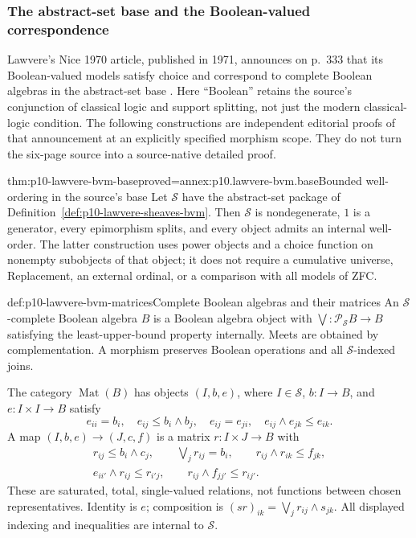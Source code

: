 \subsubsection{The abstract-set base and the Boolean-valued correspondence}

Lawvere's Nice 1970 article, published in 1971, announces on p.~333
that its Boolean-valued models satisfy choice and correspond to complete
Boolean algebras in the abstract-set base \cite[p.~333]{Lawvere1970}.
Here ``Boolean'' retains the source's conjunction of classical logic and
support splitting, not just the modern classical-logic condition.
The following constructions are independent editorial proofs of that
announcement at an explicitly specified morphism scope. They do not turn
the six-page source into a source-native detailed proof.

\begin{hblemma}{thm:p10-lawvere-bvm-base}{proved=annex:p10.lawvere-bvm.base}{Bounded well-ordering in the source's base}
Let \(\mathcal S\) have the abstract-set package of
Definition~\ref{def:p10-lawvere-sheaves-bvm}. Then \(\mathcal S\)
is nondegenerate, \(1\) is a generator, every epimorphism splits,
and every object admits an internal well-order. The latter construction
uses power objects and a choice function on nonempty subobjects of that
object; it does not require a cumulative universe, Replacement, an
external ordinal, or a comparison with all models of ZFC.
\end{hblemma}

\begin{hbdefinition}{def:p10-lawvere-bvm-matrices}{Complete Boolean algebras and their matrices}
An \(\mathcal S\)-complete Boolean algebra \(B\) is a Boolean
algebra object with \(\bigvee:\mathcal P_{\mathcal S}B\to B\)
satisfying the least-upper-bound property internally. Meets are obtained
by complementation. A morphism preserves Boolean operations and all
\(\mathcal S\)-indexed joins.

The category \(\operatorname{Mat}(B)\) has objects \((I,b,e)\),
where \(I\in\mathcal S\), \(b:I\to B\), and
\(e:I\times I\to B\) satisfy
\[
 e_{ii}=b_i,\quad e_{ij}\le b_i\wedge b_j,\quad
 e_{ij}=e_{ji},\quad e_{ij}\wedge e_{jk}\le e_{ik}.
\]
A map \((I,b,e)\to(J,c,f)\) is a matrix \(r:I\times J\to B\)
with
\[
\begin{gathered}
 r_{ij}\le b_i\wedge c_j,\qquad \bigvee_j r_{ij}=b_i,\qquad
 r_{ij}\wedge r_{ik}\le f_{jk},\\
 e_{ii'}\wedge r_{ij}\le r_{i'j},\qquad
 r_{ij}\wedge f_{jj'}\le r_{ij'}.
\end{gathered}
\]
These are saturated, total, single-valued relations, not functions between
chosen representatives. Identity is \(e\); composition is
\((sr)_{ik}=\bigvee_j r_{ij}\wedge s_{jk}\).
All displayed indexing and inequalities are internal to \(\mathcal S\).
\end{hbdefinition}

